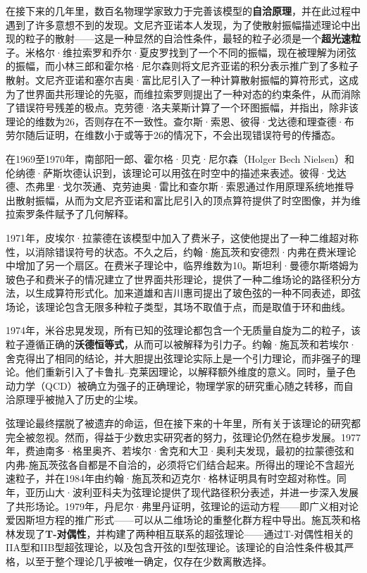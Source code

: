 在接下来的几年里，数百名物理学家致力于完善该模型的\textbf{自洽原理}，并在此过程中遇到了许多意想不到的发现。文尼齐亚诺本人发现，为了使散射振幅描述理论中出现的粒子的散射——这是一种显然的自洽性条件，最轻的粒子必须是一个\textbf{超光速粒}子。米格尔·维拉索罗和乔尔·夏皮罗找到了一个不同的振幅，现在被理解为闭弦的振幅，而小林三郎和霍尔格·尼尔森则将文尼齐亚诺的积分表示推广到了多粒子散射。文尼齐亚诺和塞尔吉奥·富比尼引入了一种计算散射振幅的算符形式，这成为了世界面共形理论的先驱，而维拉索罗则提出了一种对态的约束条件，从而消除了错误符号残差的极点。克劳德·洛夫莱斯计算了一个环图振幅，并指出，除非该理论的维数为26，否则存在不一致性。查尔斯·索恩、彼得·戈达德和理查德·布劳尔随后证明，在维数小于或等于26的情况下，不会出现错误符号的传播态。

在1969至1970年，南部阳一郎、霍尔格·贝克·尼尔森（Holger Bech Nielsen）和伦纳德·萨斯坎德认识到，该理论可以用弦在时空中的描述来表述。彼得·戈达德、杰弗里·戈尔茨通、克劳迪奥·雷比和查尔斯·索恩通过作用原理系统地推导出散射振幅，从而为文尼齐亚诺和富比尼引入的顶点算符提供了时空图像，并为维拉索罗条件赋予了几何解释。

1971年，皮埃尔·拉蒙德在该模型中加入了费米子，这使他提出了一种二维超对称性，以消除错误符号的状态。不久之后，约翰·施瓦茨和安德烈·内弗在费米理论中增加了另一个扇区。在费米子理论中，临界维数为10。斯坦利·曼德尔斯塔姆为玻色子和费米子的情况建立了世界面共形理论，提供了一种二维场论的路径积分方法，以生成算符形式化。加来道雄和吉川惠司提出了玻色弦的一种不同表述，即弦场论，该理论包含无限多种粒子类型，其场不取值于点，而是取值于环和曲线。

1974年，米谷忠晃发现，所有已知的弦理论都包含一个无质量自旋为二的粒子，该粒子遵循正确的\textbf{沃德恒等式}，从而可以被解释为引力子。约翰·施瓦茨和若埃尔·舍克得出了相同的结论，并大胆提出弦理论实际上是一个引力理论，而非强子的理论。他们重新引入了卡鲁扎–克莱因理论，以解释额外维度的意义。同时，量子色动力学（QCD）被确立为强子的正确理论，物理学家的研究重心随之转移，而自洽原理乎被抛入了历史的尘埃。

弦理论最终摆脱了被遗弃的命运，但在接下来的十年里，所有关于该理论的研究都完全被忽视。然而，得益于少数忠实研究者的努力，弦理论仍然在稳步发展。1977年，费迪南多·格里奥齐、若埃尔·舍克和大卫·奥利夫发现，最初的拉蒙德弦和内弗-施瓦茨弦各自都是不自洽的，必须将它们结合起来。所得出的理论不含超光速粒子，并在1984年由约翰·施瓦茨和迈克尔·格林证明具有时空超对称性。同年，亚历山大·波利亚科夫为弦理论提供了现代路径积分表述，并进一步深入发展了共形场论。1979年，丹尼尔·弗里丹证明，弦理论的运动方程——即广义相对论爱因斯坦方程的推广形式——可以从二维场论的重整化群方程中导出。施瓦茨和格林发现了\textbf{T-对偶性}，并构建了两种相互联系的超弦理论——通过T-对偶性相关的IIA型和IIB型超弦理论，以及包含开弦的I型弦理论。该理论的自洽性条件极其严格，以至于整个理论几乎被唯一确定，仅存在少数离散选择。
